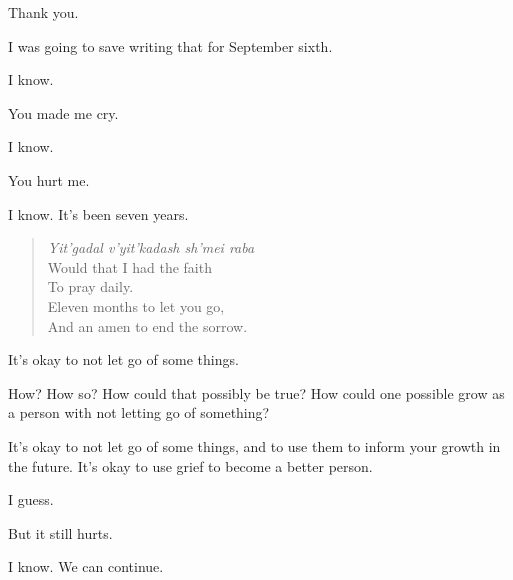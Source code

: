 \vfill

\begin{center}
\end{center}
\newpage

\begin{ally}
Thank you.
\end{ally}
I was going to save writing that for September sixth.

\begin{ally}
I know.
\end{ally}
You made me cry.

\begin{ally}
I know.
\end{ally}
You hurt me.

\begin{ally}
I know. It's been seven years.
\end{ally}

\begin{verse}
  \emph{Yit'gadal v'yit'kadash sh'mei raba}\\
  Would that I had the faith\\
  To pray daily.\\
  Eleven months to let you go,\\
  And an amen to end the sorrow.
\end{verse}

\begin{ally}
It's okay to not let go of some things.
\end{ally}
How? How so? How could that possibly be true? How could one possible grow as a person with not letting go of something?

\begin{ally}
It's okay to not let go of some things, and to use them to inform your growth in the future. It's okay to use grief to become a better person.
\end{ally}
I guess.

But it still hurts.

\begin{ally}
I know. We can continue.
\end{ally}
\newpage
{}

